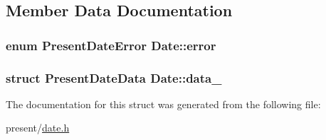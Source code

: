 \subsection{\-Member \-Data \-Documentation}
\hypertarget{structDate_adb2a42cb857f6462788b856b2f60cfb2}{
\subsubsection[{error}]{\setlength{\rightskip}{0pt plus 5cm}enum {\bf \-Present\-Date\-Error} {\bf \-Date\-::error}}}\label{structDate_adb2a42cb857f6462788b856b2f60cfb2}
\hypertarget{structDate_a15a7ce699435bf3c9c60bfff5e1806de}{
\subsubsection[{data\-\_\-}]{\setlength{\rightskip}{0pt plus 5cm}struct \-Present\-Date\-Data {\bf \-Date\-::data\-\_\-}}}\label{structDate_a15a7ce699435bf3c9c60bfff5e1806de}


\-The documentation for this struct was generated from the following file\-:\begin{DoxyCompactItemize}
\item 
present/\hyperlink{date_8h}{date.\-h}\end{DoxyCompactItemize}
